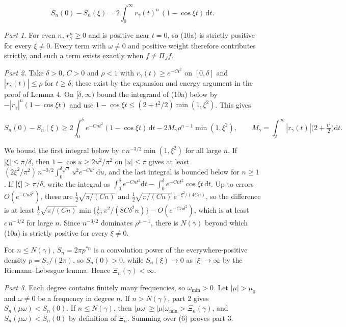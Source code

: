 \documentclass[
  british,
  11pt,
  a4paper,
]{article}
\begin{document}
\[
S_n(0)-S_n(\xi)=2\int_0^\infty r_\gamma(t)^n\,(1-\cos\xi t)\,\mathrm dt. \tag{10a}
\]

\emph{Part 1.} For even \(n\), \(r_\gamma^n\ge0\) and is positive near
\(t=0\), so (10a) is strictly positive for every \(\xi\ne0\). Every term
with \(\omega\ne0\) and positive weight therefore contributes strictly,
and such a term exists exactly when \(f\ne\Pi_Jf\).

\emph{Part 2.} Take \(\delta>0\), \(C>0\) and \(\rho<1\) with
\(r_\gamma(t)\ge e^{-Ct^2}\) on \([0,\delta]\) and
\(|r_\gamma(t)|\le\rho\) for \(t\ge\delta\); these exist by the
expansion and energy argument in the proof of Lemma 4. On
\([\delta,\infty)\) bound the integrand of (10a) below by
\(-|r_\gamma|^n(1-\cos\xi t)\) and use
\(1-\cos\xi t\le(2+t^2/2)\min(1,\xi^2)\). This gives

\[
S_n(0)-S_n(\xi)\ge 2\int_0^\delta e^{-Cnt^2}(1-\cos\xi t)\,\mathrm dt-2M_\gamma\rho^{n-1}\min(1,\xi^2),
\qquad M_\gamma=\int_\delta^\infty|r_\gamma(t)|\bigl(2+\tfrac{t^2}2\bigr)\mathrm dt .
\]

We bound the first integral below by \(c\,n^{-3/2}\min(1,\xi^2)\) for
all large \(n\). If \(|\xi|\le\pi/\delta\), then
\(1-\cos u\ge2u^2/\pi^2\) on \(|u|\le\pi\) gives at least
\((2\xi^2/\pi^2)\,n^{-3/2}\int_0^{\delta\sqrt n}u^2e^{-Cu^2}\,\mathrm du\),
and the last integral is bounded below for \(n\ge1\). If
\(|\xi|>\pi/\delta\), write the integral as
\(\int_0^\delta e^{-Cnt^2}\mathrm dt-\int_0^\delta e^{-Cnt^2}\cos\xi t\,\mathrm dt\).
Up to errors \(O(e^{-Cn\delta^2})\), these are
\(\tfrac12\sqrt{\pi/(Cn)}\) and
\(\tfrac12\sqrt{\pi/(Cn)}\,e^{-\xi^2/(4Cn)}\), so the difference is at
least
\(\tfrac12\sqrt{\pi/(Cn)}\min\{\tfrac12,\pi^2/(8C\delta^2n)\}-O(e^{-Cn\delta^2})\),
which is at least \(c\,n^{-3/2}\) for large \(n\). Since \(n^{-3/2}\)
dominates \(\rho^{n-1}\), there is \(N(\gamma)\) beyond which (10a) is
strictly positive for every \(\xi\ne0\).

For \(n\le N(\gamma)\), \(S_n=2\pi p^{*n}\) is a convolution power of
the everywhere-positive density \(p=S_\gamma/(2\pi)\), so \(S_n(0)>0\),
while \(S_n(\xi)\to0\) as \(|\xi|\to\infty\) by the Riemann--Lebesgue
lemma. Hence \(\Xi_n(\gamma)<\infty\).

\emph{Part 3.} Each degree contains finitely many frequencies, so
\(\omega_{\min}>0\). Let \(|\mu|>\mu_0\) and \(\omega\ne0\) be a
frequency in degree \(n\). If \(n>N(\gamma)\), part 2 gives
\(S_n(\mu\omega)<S_n(0)\). If \(n\le N(\gamma)\), then
\(|\mu\omega|\ge|\mu|\omega_{\min}>\Xi_n(\gamma)\), and
\(S_n(\mu\omega)<S_n(0)\) by definition of \(\Xi_n\). Summing over (6)
proves part 3.
\end{document}
